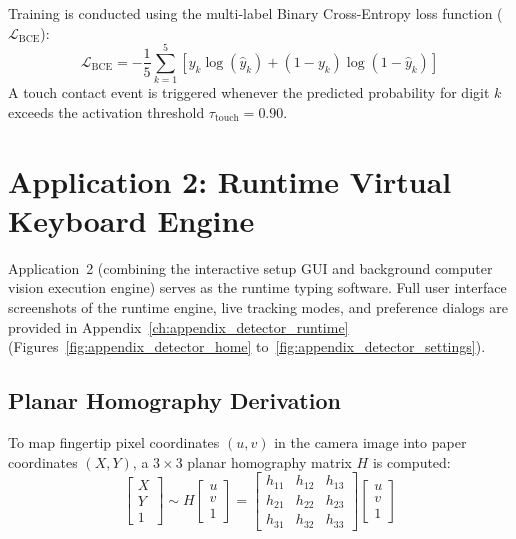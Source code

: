 Training is conducted using the multi-label Binary Cross-Entropy loss function ($\mathcal{L}_{\text{BCE}}$):
\begin{equation}
\mathcal{L}_{\text{BCE}} = -\frac{1}{5} \sum_{k=1}^{5} \left[ y_k \log(\hat{y}_k) + (1 - y_k) \log(1 - \hat{y}_k) \right]
\label{eq:meth_bce_loss}
\end{equation}
A touch contact event is triggered whenever the predicted probability for digit $k$ exceeds the activation threshold $\tau_{\text{touch}} = 0.90$.

\section{Application 2: Runtime Virtual Keyboard Engine}
\label{sec:meth_runtime_engine}
Application~2 (combining the interactive setup GUI and background computer vision execution engine) serves as the runtime typing software. Full user interface screenshots of the runtime engine, live tracking modes, and preference dialogs are provided in Appendix~\ref{ch:appendix_detector_runtime} (Figures~\ref{fig:appendix_detector_home} to~\ref{fig:appendix_detector_settings}).

\subsection{Planar Homography Derivation}
\label{subsec:meth_homography_derivation}
To map fingertip pixel coordinates $(u, v)$ in the camera image into paper coordinates $(X, Y)$, a $3 \times 3$ planar homography matrix $H$ is computed:
\begin{equation}
\begin{bmatrix} X \\ Y \\ 1 \end{bmatrix} \sim H \begin{bmatrix} u \\ v \\ 1 \end{bmatrix} = \begin{bmatrix} h_{11} & h_{12} & h_{13} \\ h_{21} & h_{22} & h_{23} \\ h_{31} & h_{32} & h_{33} \end{bmatrix} \begin{bmatrix} u \\ v \\ 1 \end{bmatrix}
\label{eq:meth_homography_matrix}
\end{equation}

